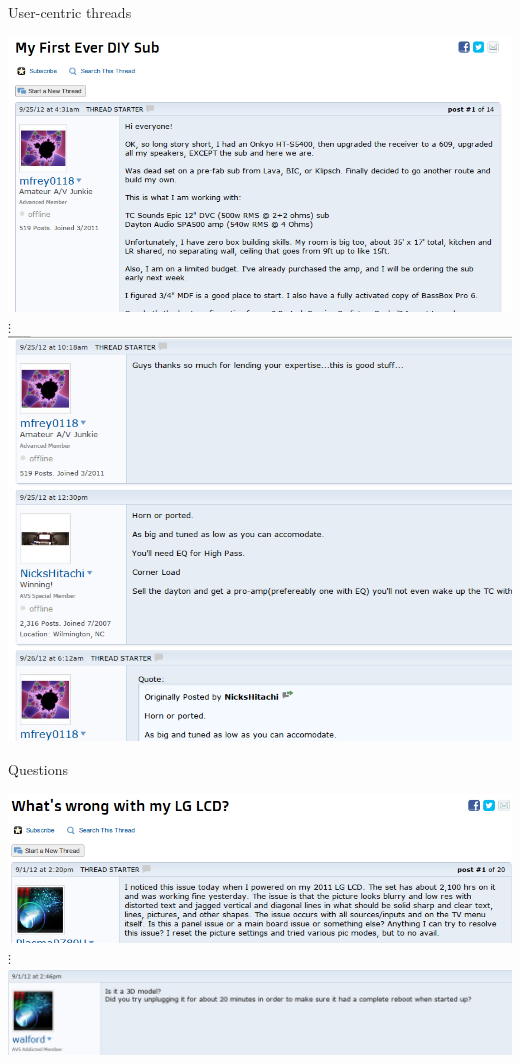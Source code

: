 \documentclass[12pt]{presentation}
\begin{document}
\begin{frame}{User-centric threads}
	\begin{center}
		\includegraphics[scale=0.2]{screenshots/revolve_user.png}\\
			$\vdots$\\
		\includegraphics[scale=0.2]{screenshots/revolve_user2.png}
	\end{center}
\end{frame}


\begin{frame}{Questions}
	\begin{center}
		\includegraphics[scale=0.4]{screenshots/question.png}\\
			$\vdots$\\
		\includegraphics[scale=0.4]{screenshots/question2.png}
	\end{center}
\end{frame}
\end{document}
